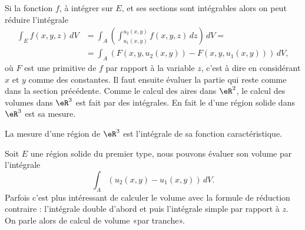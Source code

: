 Si la fonction $f$, à intégrer sur $E$, et ses sections sont intégrables  alors on peut réduire l'intégrale 
\begin{equation}
  \begin{aligned}
     \int_E  f(x,y,z)\, dV&=\int_A\left(\int_{u_1(x,y)}^{u_2(x,y)}f(x,y,z)\, dz \right) \, dV=\\
&=\int_A\left(F(x,y,u_2(x,y))-F(x,y,u_1(x,y))\right)\, dV,
  \end{aligned}
\end{equation}
où $F$ est une primitive de $f$ par rapport à la variable $z$, c'est à dire en considérant $x$ et $y$ comme des constantes. Il faut ensuite évaluer la partie qui reste comme dans la section précédente. Comme le calcul des aires  dans $\eR^2$, le calcul des volumes dans $\eR^3$ est fait par des intégrales. En fait le  d'une région solide dans $\eR^3$ est sa mesure. 
\begin{definition}
   La mesure d'une région de  $\eR^3$ est l'intégrale de sa fonction caractéristique. 
\end{definition}
Soit $E$ une région solide du premier type, nous pouvons évaluer son volume par l'intégrale
\[
\int_A\left(u_2(x,y)-u_1(x,y)\right)\, dV.
\]  
Parfois c'est plus intéressant de calculer le volume avec la formule de réduction contraire : l'intégrale double d'abord et puis l'intégrale simple par rapport à $z$. On parle alors de calcul de volume «par tranche».

